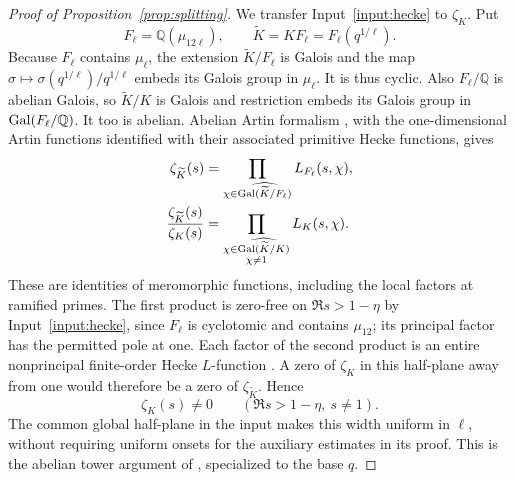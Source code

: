 \begin{proof}[Proof of Proposition~\ref{prop:splitting}]
We transfer Input~\ref{input:hecke} to \(\zeta_K\).  Put
\[
 F_\ell=\mathbb Q(\mu_{12\ell}),\qquad
 \widetilde K=KF_\ell=F_\ell(q^{1/\ell}).
\]
Because \(F_\ell\) contains \(\mu_\ell\), the extension
\(\widetilde K/F_\ell\) is Galois and the map
\(\sigma\mapsto\sigma(q^{1/\ell})/q^{1/\ell}\) embeds its Galois group
in \(\mu_\ell\).  It is thus cyclic.  Also \(F_\ell/\mathbb Q\) is abelian
Galois, so \(\widetilde K/K\) is Galois and restriction embeds its Galois
group in \(\operatorname{Gal}(F_\ell/\mathbb Q)\).  It too is abelian.  Abelian Artin
formalism \cite[Chapter~VII, Corollary~(10.5) and Theorem~(10.6)]{Neukirch1999},
with the one-dimensional Artin functions identified with their associated
primitive Hecke functions, gives
\begin{equation}
 \begin{aligned}
 \zeta_{\widetilde K}(s)
  &=\prod_{\chi\in\widehat{\operatorname{Gal}(\widetilde K/F_\ell)}}L_{F_\ell}(s,\chi),\\
 \frac{\zeta_{\widetilde K}(s)}{\zeta_K(s)}
  &=\prod_{\substack{\chi\in\widehat{\operatorname{Gal}(\widetilde K/K)}\\\chi\ne1}}
       L_K(s,\chi).
 \end{aligned}
 \label{eq:abelian-zeta-factorizations}
\end{equation}
These are identities of meromorphic functions, including the local factors
at ramified primes.  The first product is zero-free on \(\Re s>1-\eta\)
by Input~\ref{input:hecke}, since \(F_\ell\) is cyclotomic and contains
\(\mu_{12}\); its principal factor has the permitted pole at one.  Each
factor of the second product is an entire nonprincipal finite-order Hecke
\(L\)-function \cite{Tate1967}.  A zero of \(\zeta_K\) in this half-plane away from one
would therefore be a zero of \(\zeta_{\widetilde K}\).  Hence
\begin{equation}
 \zeta_K(s)\ne0\qquad(\Re s>1-\eta,\ s\ne1).
 \label{eq:kummer-zero-free}
\end{equation}
The common global half-plane in the input makes this width uniform in
\(\ell\), without requiring uniform onsets for the auxiliary estimates in
its proof.  This is the abelian tower argument of
\cite[Section~9, Equation~(9.2)]{PrimitiveRoot2}, specialized to the
base \(q\).


\end{proof}
